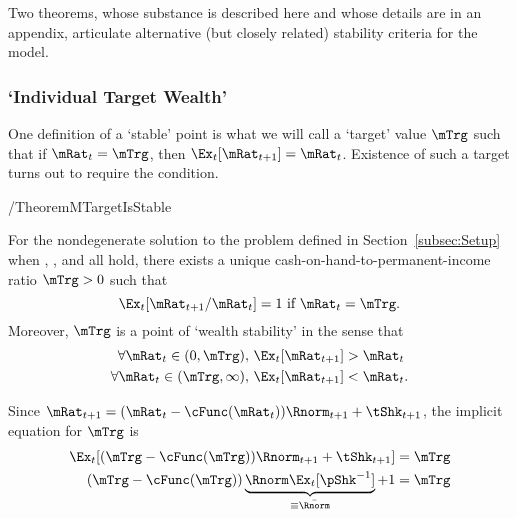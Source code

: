\documentclass[BufferStockTheory]{subfiles}
\begin{document}
Two theorems, whose substance is described here and whose details are in an appendix, articulate alternative (but closely related) stability criteria for the model.

\subsubsection{`Individual Target Wealth'}\label{subsubsec:mTarget}
One definition of a `stable' point is what we will call a `target' value $\mTrg$ such that if $\mRat_{t}=\mTrg$, then $\Ex_{t}[\mRat_{t+1}]=\mRat_{t}$.  Existence of such a target turns out to require the {\GICNrm} condition.

\begin{verbatimwrite}{\EqDir/TheoremMTargetIsStable}
  \begin{theorem}\label{thm:target}
    For the nondegenerate solution to the problem defined in Section~\ref{subsec:Setup} when {\FVAC}, {\WRIC}, and {\GICNrm} all hold, there exists a unique cash-on-hand-to-permanent-income ratio $\mTrg>0$ such that
    \begin{equation}
      \Ex_t [{\mRat}_{t+1}/\mRat_t] = 1 \mbox{~if~} \mRat_t = \mTrg.
      \label{eq:mTarget}
    \end{equation}
    Moreover, $\mTrg$ is a point of `wealth stability' in the sense that
    \begin{equation} \label{eq:stability}
      \begin{split}
        \forall {\mRat}_t\in(0,\mTrg),      \,\,& \Ex_t [{\mRat}_{t+1}] > {\mRat}_t  \\
        \forall {\mRat}_t\in(\mTrg,\infty), \,\,& \Ex_t [{\mRat}_{t+1}] < {\mRat}_t.
      \end{split}
    \end{equation}
  \end{theorem}
\end{verbatimwrite}


\hypertarget{mTargImplicit}{}

Since $\mRat_{t+1}=(\mRat_{t}-\cFunc(\mRat_{t}))\Rnorm_{t+1}+\tShk_{t+1}$, the implicit equation for $\mTrg$ is
\begin{equation} \label{eq:mTargImplicit}
  \begin{split}
    \Ex_{t}[(\mTrg-\cFunc(\mTrg))\Rnorm_{t+1}+\tShk_{t+1}] & = \mTrg 
    \\   (\mTrg-\cFunc(\mTrg))\underbrace{\Rnorm\Ex_{t}[\pShk^{-1}]}_{\equiv \bar{\Rnorm}}+1 & = \mTrg 
  \end{split}
\end{equation}
\end{document}
